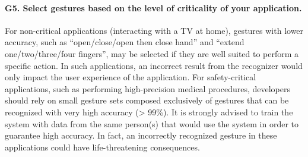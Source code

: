 \paragraph{G5. Select gestures based on the level of criticality of your application.}
For non-critical applications (\eg interacting with a TV at home), gestures with lower accuracy, such as ``open/close/open then close hand'' and ``extend one/two/three/four fingers'', may be selected if they are well suited to perform a specific action. In such applications, an incorrect result from the recognizer would only impact the user experience of the application.
%
For safety-critical applications, such as performing high-precision medical procedures, developers should rely on small gesture sets composed exclusively of gestures that can be recognized with very high accuracy (> 99\%). It is strongly advised to train the system with data from the same person(s) that would use the system in order to guarantee high accuracy. In fact, an incorrectly recognized gesture in these applications could have life-threatening consequences. 
    
    
    

